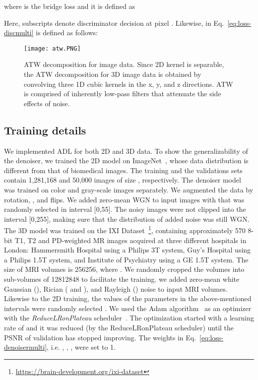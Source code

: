 \documentclass[journal,twoside,web]{ieeecolor}
\begin{document}
where  is the bridge loss and it is defined as 

Here, subscripts  denote discriminator decision at pixel . Likewise,  in Eq.~\ref{eq:loss-discmulti} is defined as follows:

\begin{figure}
    \centering
    \texttt{[image: atw.PNG]}
\caption{ATW decomposition for image data. Since 2D kernel  is separable, the ATW decomposition for 3D image data is obtained by convolving three 1D cubic kernels in the x, y, and z directions. ATW is comprised of inherently low-pass filters that attenuate the side effects of noise.}
\label{fig:atw}
\end{figure}
\subsection{Training details}\label{sec:implementation}
We implemented ADL for both 2D and 3D data. To show the generalizability of the denoiser, we trained the 2D model on ImageNet~\cite{russakovsky2015imagenet}, whose data distribution is different from that of biomedical images. 
The training and the validations sets contain 1,281,168 and 50,000 images of size , respectively. 
The denoiser model was trained on color and gray-scale images separately. We augmented the data by rotation, , and flips. 
We added zero-mean WGN to input images with  that was randomly selected in interval [0,55]. 
The noisy images were not clipped into the interval [0,255], making sure that the distribution of added noise was still WGN. 
The 3D model was trained on the IXI Dataset~\footnote{\url{https://brain-development.org/ixi-dataset}}, containing approximately 570 8-bit T1, T2 and PD-weighted MR images acquired at three different hospitals in London: Hammersmith Hospital using a Philips 3T system, Guy’s Hospital using a Philips 1.5T system, and Institute of Psychiatry using a GE 1.5T system. 
The size of MRI volumes is 256256, where .
We randomly cropped the volumes into sub-volumes of 12812848 to facilitate the training. 
we added zero-mean white Gaussian (), Rician ( and ), and Rayleigh () noise to input MRI volumes. Likewise to the 2D training, the values of the parameters in the above-mentioned intervals were randomly selected . 
We used the Adam algorithm~\cite{kingma2014adam} as an optimizer with the \textit{ReduceLRonPlateau} scheduler~\cite{ReduceLROnPlateau}. The optimization started with a learning rate of  and it was reduced (by the ReduceLRonPlateau scheduler) until the PSNR of validation has stopped improving. 
The 
weights in Eq.~\ref{eq:loss-denoisermulti}, i.e. , , , were set to 1.
\end{document}
